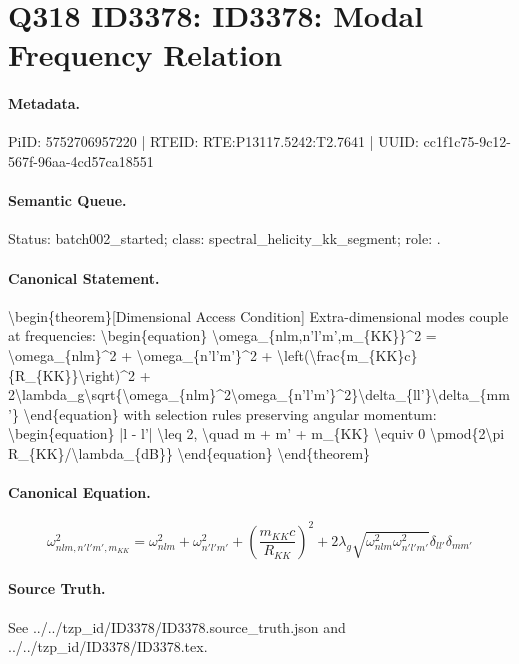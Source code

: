 \section*{Q318 ID3378: ID3378: Modal Frequency Relation}
\paragraph{Metadata.}
PiID: 5752706957220 | RTEID: RTE:P13117.5242:T2.7641 | UUID: cc1f1c75-9c12-567f-96aa-4cd57ca18551

\paragraph{Semantic Queue.}
Status: batch002\_started; class: spectral\_helicity\_kk\_segment; role: .

\paragraph{Canonical Statement.}
\textbackslash{}begin\{theorem\}[Dimensional Access Condition] Extra-dimensional modes couple at frequencies: \textbackslash{}begin\{equation\} \textbackslash{}omega\_\{nlm,n'l'm',m\_\{KK\}\}\textasciicircum{}2 = \textbackslash{}omega\_\{nlm\}\textasciicircum{}2 + \textbackslash{}omega\_\{n'l'm'\}\textasciicircum{}2 + \textbackslash{}left(\textbackslash{}frac\{m\_\{KK\}c\}\{R\_\{KK\}\}\textbackslash{}right)\textasciicircum{}2 + 2\textbackslash{}lambda\_g\textbackslash{}sqrt\{\textbackslash{}omega\_\{nlm\}\textasciicircum{}2\textbackslash{}omega\_\{n'l'm'\}\textasciicircum{}2\}\textbackslash{}delta\_\{ll'\}\textbackslash{}delta\_\{mm'\} \textbackslash{}end\{equation\} with selection rules preserving angular momentum: \textbackslash{}begin\{equation\} |l - l'| \textbackslash{}leq 2, \textbackslash{}quad m + m' + m\_\{KK\} \textbackslash{}equiv 0 \textbackslash{}pmod\{2\textbackslash{}pi R\_\{KK\}/\textbackslash{}lambda\_\{dB\}\} \textbackslash{}end\{equation\} \textbackslash{}end\{theorem\}

\paragraph{Canonical Equation.}
\[
\begin{equation} \omega_{nlm,n'l'm',m_{KK}}^2 = \omega_{nlm}^2 + \omega_{n'l'm'}^2 + \left(\frac{m_{KK}c}{R_{KK}}\right)^2 + 2\lambda_g \sqrt{\omega_{nlm}^2 \omega_{n'l'm'}^2} \delta_{ll'}\delta_{mm'} \end{equation}
\]

\paragraph{Source Truth.}
See ../../tzp\_id/ID3378/ID3378.source\_truth.json and ../../tzp\_id/ID3378/ID3378.tex.

